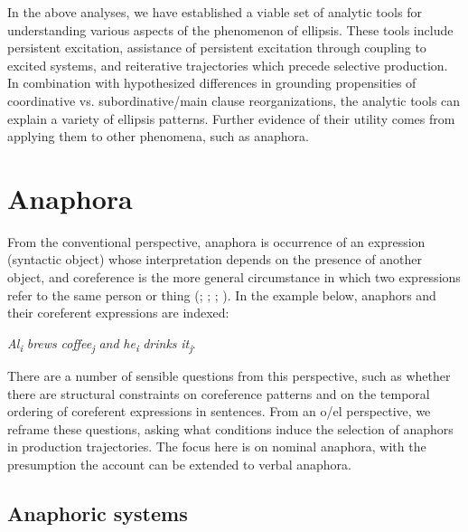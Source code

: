   In the above analyses, we have established a viable set of analytic tools for understanding various aspects of the phenomenon of ellipsis. These tools include persistent excitation, assistance of persistent excitation through coupling to excited systems, and reiterative trajectories which precede selective production. In combination with hypothesized differences in grounding propensities of coordinative vs. subordinative/main clause reorganizations, the analytic tools can explain a variety of ellipsis patterns. Further evidence of their utility comes from applying them to other phenomena, such as anaphora.

\section{Anaphora}

From the conventional perspective, anaphora is occurrence of an expression (syntactic object) whose interpretation depends on the presence of another object, and coreference is the more general circumstance in which two expressions refer to the same person or thing (\citealt{HankamerSag1976}; \citealt{Huang2000}; \citealt{Reinhart1983,Reinhart2016}; \citealt{Safir2004}). In the example below, anaphors and their coreferent expressions are indexed:

    \textit{Al\textsubscript{i}} \textit{brews} \textit{coffee\textsubscript{j}} \textit{and} \textit{he\textsubscript{i}} \textit{drinks} \textit{it\textsubscript{j}}.

  There are a number of sensible questions from this perspective, such as whether there are structural constraints on coreference patterns and on the temporal ordering of coreferent expressions in sentences. From an o/el perspective, we reframe these questions, asking what conditions induce the selection of anaphors in production trajectories. The focus here is on nominal anaphora, with the presumption the account can be extended to verbal anaphora. 

\subsection{Anaphoric systems}

